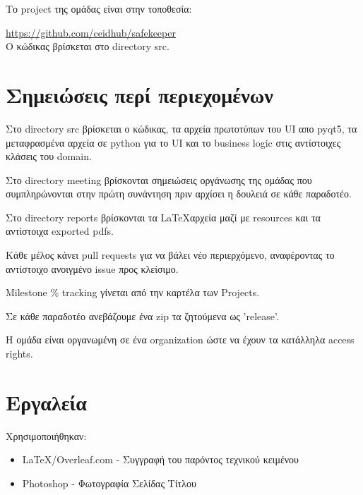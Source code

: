 \documentclass{article}
\begin{document}
Το project της ομάδας είναι στην τοποθεσία:

\url{https://github.com/ceidhub/safekeeper}
\\
Ο κώδικας βρίσκεται στο directory src.

\section{Σημειώσεις περί περιεχομένων}
Στο directory src βρίσκεται ο κώδικας, τα αρχεία πρωτοτύπων του UI απο pyqt5, τα μεταφρασμένα αρχεία σε python για το UI και το business logic στις αντίστοιχες κλάσεις του domain.


Στο directory meeting βρίσκονται σημειώσεις οργάνωσης της ομάδας που συμπληρώνονται στην πρώτη συνάντηση πριν αρχίσει η δουλειά σε κάθε παραδοτέο.


Στο directory reports βρίσκονται τα \LaTeX αρχεία μαζί με resources και τα αντίστοιχα exported pdfs.


Κάθε μέλος κάνει pull requests για να βάλει νέο περιερχόμενο, αναφέροντας το αντίστοιχο ανοιγμένο issue προς κλείσιμο.


Milestone \% tracking γίνεται από την καρτέλα των Projects.


Σε κάθε παραδοτέο ανεβάζουμε ένα zip τα ζητούμενα ως 'release'.


Η ομάδα είναι οργανωμένη σε ένα organization ώστε να έχουν τα κατάλληλα access rights.

\section{Εργαλεία}
Χρησιμοποιήθηκαν:
\begin{itemize}
    \item \LaTeX/Overleaf.com - Συγγραφή του παρόντος τεχνικού κειμένου
    \item Photoshop - Φωτογραφία Σελίδας Τίτλου
\end{itemize}
\end{document}
